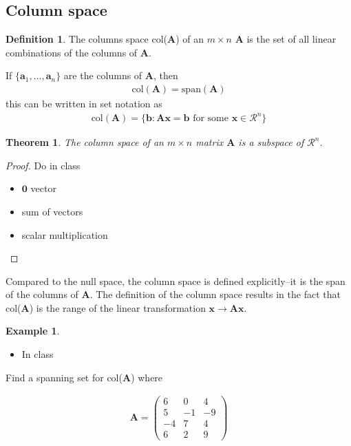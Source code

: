 \documentclass[
]{book}
\providecommand{\tightlist}{%
  \setlength{\itemsep}{0pt}\setlength{\parskip}{0pt}}
\newtheorem{theorem}{Theorem}[chapter]
\theoremstyle{definition}
\newtheorem{definition}{Definition}[chapter]
\theoremstyle{definition}
\newtheorem{example}{Example}[chapter]
\theoremstyle{definition}
\theoremstyle{definition}
\theoremstyle{remark}
\begin{document}
\hypertarget{column-space}{%
\subsection{Column space}\label{column-space}}

\begin{definition}
The columns space col(\(\mathbf{A}\)) of an \(m \times n\) \(\mathbf{A}\) is the set of all linear combinations of the columns of \(\mathbf{A}\).

If \(\{ \mathbf{a}_1, \ldots, \mathbf{a}_n\}\) are the columns of \(\mathbf{A}\), then
\[
\begin{aligned}
\mbox{col}(\mathbf{A}) = \mbox{span}(\mathbf{A})
\end{aligned}
\]
this can be written in set notation as
\[
\begin{aligned}
\mbox{col}(\mathbf{A}) = \{ \mathbf{b} : \mathbf{A} \mathbf{x} = \mathbf{b} \mbox{ for some } \mathbf{x} \in \mathcal{R}^n \}
\end{aligned}
\]
\end{definition}

\begin{theorem}
The column space of an \(m \times n\) matrix \(\mathbf{A}\) is a subspace of \(\mathcal{R}^n\).
\end{theorem}

\begin{proof}

Do in class

\begin{itemize}
\item
  \(\mathbf{0}\) vector
\item
  sum of vectors
\item
  scalar multiplication
\end{itemize}

\end{proof}

Compared to the null space, the column space is defined explicitly--it is the span of the columns of \(\mathbf{A}\). The definition of the column space results in the fact that col(\(\mathbf{A}\)) is the range of the linear transformation \(\mathbf{x} \rightarrow \mathbf{A} \mathbf{x}\).

\begin{example}

\begin{itemize}
\tightlist
\item
  In class
\end{itemize}

Find a spanning set for col(\(\mathbf{A}\)) where

\[
\begin{aligned}
\mathbf{A} = \begin{pmatrix} 6 & 0 & 4 \\ 5 & -1 & -9 \\ -4 & 7 & 4 \\ 6 & 2 & 9 \end{pmatrix}
\end{aligned}
\]

\end{example}
\end{document}
